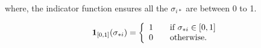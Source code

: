 where, the indicator function ensures all the $\sigma_{i*}$ are between 0 to 1.

\begin{equation}    \mathbf{1}_{[0,1]}(\sigma_{*i})=\left\{ 
  \begin{array}{ c l }
    1 & \quad \textrm{if } \sigma_{*i} \in[0,1] \\
    0                 & \quad \textrm{otherwise}.
  \end{array}\right.\end{equation}
